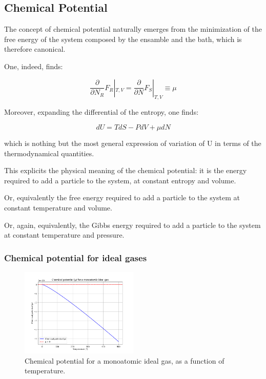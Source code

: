\documentclass{article}
\begin{document}
\subsection{Chemical Potential}

The concept of chemical potential naturally emerges from the minimization of the free energy
of the system composed by the ensamble and the bath, which is therefore canonical.

One, indeed, finds:

\begin{tcolorbox}[colframe=gray!50, colback=gray!10, coltitle=black, title=Chemical Potential]
    \begin{equation}
        \frac{\partial}{\partial N_R}F_R|_{T,V}=\frac{\partial}{\partial N}F_S|_{T,V}\equiv \mu
    \end{equation}
\end{tcolorbox}


Moreover, expanding the differential of the entropy, one finds:

\begin{equation}
    dU=TdS-PdV+\mu dN
\end{equation}

which is nothing but the most general expression of variation of U in terms of the thermodynamical quantities.

This explicits the physical meaning of the chemical potential: it is the energy required to add a particle to the system,
at constant entropy and volume.

Or, equivalently the free energy required to add a particle to the system at constant temperature and volume.

Or, again, equivalently, the Gibbs energy required to add a particle to the system at constant temperature and pressure.

\subsubsection{Chemical potential for ideal gases}

\begin{figure}[h!]
    \centering
    \includegraphics[width=0.5\textwidth]{images/statistical-physics/mu-monoatomic-ideal-gas.png}
    \caption{Chemical potential for a monoatomic ideal gas, as a function of temperature.}
    \label{fig:chemical-potential}
\end{figure}
\end{document}
